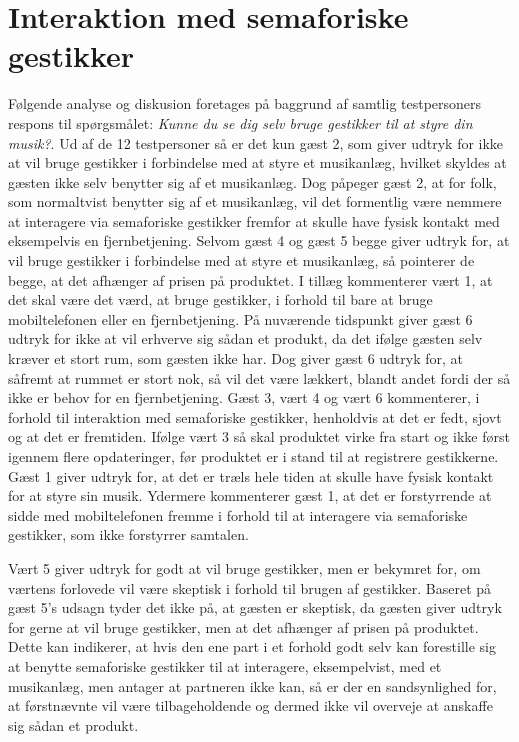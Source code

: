 \section{Interaktion med semaforiske gestikker}
\label{TestresultaterSocialAcceptBrug}
%
Følgende analyse og diskusion foretages på baggrund af samtlig testpersoners respons til spørgsmålet: \textit{Kunne du se dig selv bruge gestikker til at styre din musik?}. \blankline
%
Ud af de 12 testpersoner så er det kun gæst 2, som giver udtryk for ikke at vil bruge gestikker i forbindelse med at styre et musikanlæg, hvilket skyldes at gæsten ikke selv benytter sig af et musikanlæg. Dog påpeger gæst 2, at for folk, som normaltvist benytter sig af et musikanlæg, vil det formentlig være nemmere at interagere via semaforiske gestikker fremfor at skulle have fysisk kontakt med eksempelvis en fjernbetjening. Selvom gæst 4 og gæst 5 begge giver udtryk for, at vil bruge gestikker i forbindelse med at styre et musikanlæg, så pointerer de begge, at det afhænger af prisen på produktet. I tillæg kommenterer vært 1, at det skal være det værd, at bruge gestikker, i forhold til bare at bruge mobiltelefonen eller en fjernbetjening. På nuværende tidspunkt giver gæst 6 udtryk for ikke at vil erhverve sig sådan et produkt, da det ifølge gæsten selv kræver et stort rum, som gæsten ikke har. Dog giver gæst 6 udtryk for, at såfremt at rummet er stort nok, så vil det være lækkert, blandt andet fordi der så ikke er behov for en fjernbetjening. Gæst 3, vært 4 og vært 6 kommenterer, i forhold til interaktion med semaforiske gestikker, henholdvis at det er fedt, sjovt og at det er fremtiden. Ifølge vært 3 så skal produktet virke fra start og ikke først igennem flere opdateringer, før produktet er i stand til at registrere gestikkerne. Gæst 1 giver udtryk for, at det er træls hele tiden at skulle have fysisk kontakt for at styre sin musik. Ydermere kommenterer gæst 1, at det er forstyrrende at sidde med mobiltelefonen fremme i forhold til at interagere via semaforiske gestikker, som ikke forstyrrer samtalen.

Vært 5 giver udtryk for godt at vil bruge gestikker, men er bekymret for, om værtens forlovede vil være skeptisk i forhold til brugen af gestikker. Baseret på gæst 5's udsagn tyder det ikke på, at gæsten er skeptisk, da gæsten giver udtryk for gerne at vil bruge gestikker, men at det afhænger af prisen på produktet. Dette kan indikerer, at hvis den ene part i et forhold godt selv kan forestille sig at benytte semaforiske gestikker til at interagere, eksempelvist, med et musikanlæg, men antager at partneren ikke kan, så er der en sandsynlighed for, at førstnævnte vil være tilbageholdende og dermed ikke vil overveje at anskaffe sig sådan et produkt.    

